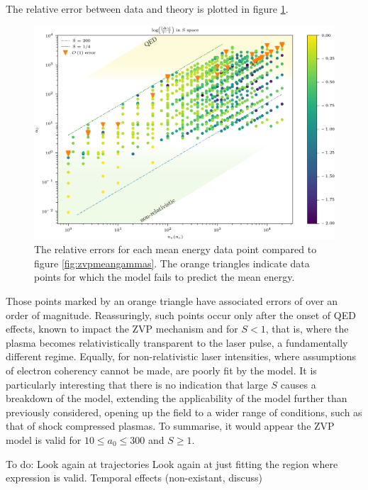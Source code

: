 The relative error between data and theory is plotted in figure \ref{fig:zvp-logabserrortedit}. 
\begin{figure}
	\centering
	\includegraphics[width=1\linewidth]{figures/zvp/log_abs_error_T_edit}
	\caption[The relative errors for each mean energy data point compared to figure \ref{fig:zvpmeangammas}.]{The relative errors for each mean energy data point compared to figure \ref{fig:zvpmeangammas}. The orange triangles indicate data points for which the model fails to predict the mean energy.}
	\label{fig:zvp-logabserrortedit}
\end{figure}
Those points marked by an orange triangle have associated errors of over an order of magnitude. Reassuringly, such points occur only after the onset of QED effects, known to impact the ZVP mechanism \cite{savinEnergyAbsorptionLaserQED2019} and for $S<1$, that is, where the plasma becomes relativistically transparent to the laser pulse, a fundamentally different regime. Equally, for non-relativistic laser intensities, where assumptions of electron coherency cannot be made, are poorly fit by the model. It is particularly interesting that there is no indication that large $S$ causes a breakdown of the model, extending the applicability of the model further than previously considered, opening up the field to a wider range of conditions, such as that of shock compressed plasmas. To summarise, it would appear the ZVP model is valid for $10 \le a_0 \le 300$ and $S\ge1$.



To do:
Look again at trajectories
Look again at just fitting the region where expression is valid.
Temporal effects (non-existant, discuss)


